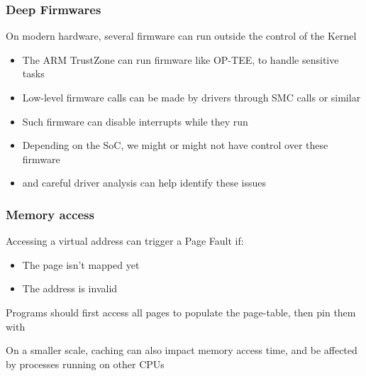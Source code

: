 \begin{frame}
        \frametitle{Deep Firmwares}
        On modern hardware, several firmware can run outside the control of the Kernel
        \begin{itemize}
                \item The ARM TrustZone can run firmware like OP-TEE, to handle sensitive tasks
                \item Low-level firmware calls can be made by drivers through SMC calls or similar
                \item Such firmware can disable interrupts while they run
                \item Depending on the SoC, we might or might not have control over these firmware
                \item {} and careful driver analysis can help identify these issues
        \end{itemize}
\end{frame}

\begin{frame}
        \frametitle{Memory access}
        Accessing a virtual address can trigger a Page Fault if:
        \begin{itemize}
                \item The page isn't mapped yet
                \item The address is invalid
        \end{itemize}
        Programs should first access all pages to populate the page-table, then
        pin them with 

        On a smaller scale, caching can also impact memory access time, and be affected by
        processes running on other CPUs
\end{frame}

